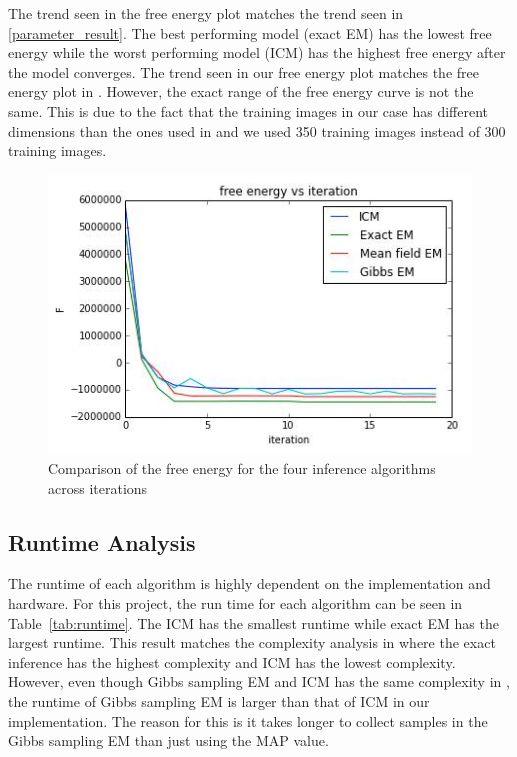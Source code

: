 \documentclass{article} %
\begin{document}
The trend seen in the free energy plot matches the trend seen in \ref{parameter_result}. The best performing model (exact EM) has the lowest free energy while the worst performing model (ICM) has the highest free energy after the model converges. The trend seen in our free energy plot matches the free energy plot in \cite{b2}. However, the exact range of the free energy curve is not the same. This is due to the fact that the training images in our case has different dimensions than the ones used in \cite{b2} and we used 350 training images instead of 300 training images. 
\begin{figure}[h]
\begin{center}
\includegraphics[width=1\textwidth]{free_energy}
\end{center}
\caption{Comparison of the free energy for the four inference algorithms across iterations}
\label{fig:free_energy}
\end{figure}

\subsection{Runtime Analysis}
\label{runtime}
The runtime of each algorithm is highly dependent on the implementation and hardware. For this project, the run time for each algorithm can be seen in Table~\ref{tab:runtime}. The ICM has the smallest runtime while exact EM has the largest runtime. This result matches the complexity analysis in \cite{b2} where the exact inference has the highest complexity and ICM has the lowest complexity. However, even though Gibbs sampling EM and ICM has the same complexity in \cite{b2}, the runtime of Gibbs sampling EM is larger than that of ICM in our implementation. The reason for this is it takes longer to collect samples in the Gibbs sampling EM than just using the MAP value.
\end{document}
